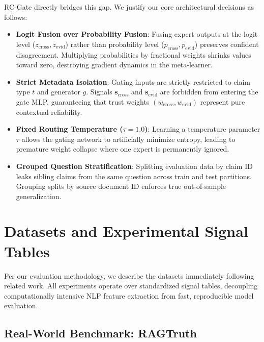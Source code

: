 \documentclass[pdflatex,sn-mathphys,Numbered]{sn-jnl}
\begin{document}
RC-Gate directly bridges this gap. We justify our core architectural decisions as follows:
\begin{itemize}
    \item \textbf{Logit Fusion over Probability Fusion}: Fusing expert outputs at the logit level ($z_{\mathrm{cross}}, z_{\mathrm{evid}}$) rather than probability level ($p_{\mathrm{cross}}, p_{\mathrm{evid}}$) preserves confident disagreement. Multiplying probabilities by fractional weights shrinks values toward zero, destroying gradient dynamics in the meta-learner.
    \item \textbf{Strict Metadata Isolation}: Gating inputs are strictly restricted to claim type $t$ and generator $g$. Signals $\mathbf{s}_{\mathrm{cross}}$ and $\mathbf{s}_{\mathrm{evid}}$ are forbidden from entering the gate MLP, guaranteeing that trust weights $(w_{\mathrm{cross}}, w_{\mathrm{evid}})$ represent pure contextual reliability.
    \item \textbf{Fixed Routing Temperature ($\tau = 1.0$)}: Learning a temperature parameter $\tau$ allows the gating network to artificially minimize entropy, leading to premature weight collapse where one expert is permanently ignored.
    \item \textbf{Grouped Question Stratification}: Splitting evaluation data by claim ID leaks sibling claims from the same question across train and test partitions. Grouping splits by source document ID enforces true out-of-sample generalization.
\end{itemize}

\section{Datasets and Experimental Signal Tables}\label{sec:datasets}

Per our evaluation methodology, we describe the datasets immediately following related work. All experiments operate over standardized signal tables, decoupling computationally intensive NLP feature extraction from fast, reproducible model evaluation.

\subsection{Real-World Benchmark: RAGTruth}\label{subsec:ragtruth_ds}
\end{document}
